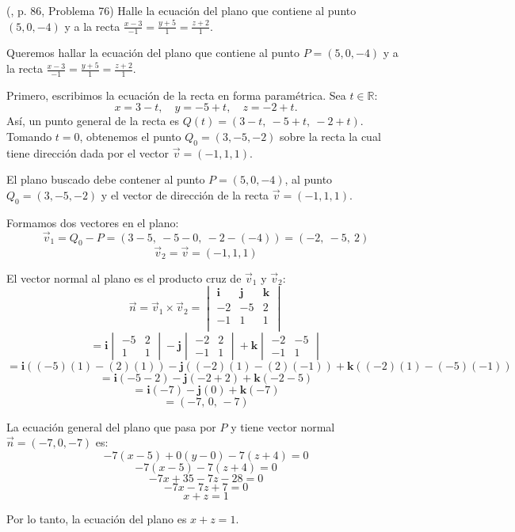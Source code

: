 \begin{prob} (\cite{espinoza2006Algebralineal}, p. 86, Problema 76) Halle la ecuación del plano que contiene al punto $(5,0,-4)$ y a la recta $\frac{x-3}{-1}=\frac{y+5}{1}=\frac{z+2}{1}$. 
\begin{myproof}
Queremos hallar la ecuación del plano que contiene al punto $P = (5,0,-4)$ y a la recta \(\frac{x-3}{-1} = \frac{y+5}{1} = \frac{z+2}{1}.\)

Primero, escribimos la ecuación de la recta en forma paramétrica. Sea $t \in \mathbb{R}$:
\[
x = 3 - t, \quad y = -5 + t, \quad z = -2 + t.
\]
Así, un punto general de la recta es $Q(t) = (3 - t,\ -5 + t,\ -2 + t)$.  
Tomando $t = 0$, obtenemos el punto $Q_0 = (3, -5, -2)$ sobre la recta la cual tiene dirección dada por el vector $\vec{v} = (-1,1,1)$.

El plano buscado debe contener al punto $P = (5,0,-4)$, al punto $Q_0 = (3,-5,-2)$ y el vector de dirección de la recta $\vec{v} = (-1,1,1)$.

Formamos dos vectores en el plano:
\[
\vec{v}_1 = Q_0 - P = (3-5,\ -5-0,\ -2-(-4)) = (-2,\ -5,\ 2)
\]
\[
\vec{v}_2 = \vec{v} = (-1,1,1)
\]

El vector normal al plano es el producto cruz de $\vec{v}_1$ y $\vec{v}_2$:
\[
\vec{n} = \vec{v}_1 \times \vec{v}_2 = 
\begin{vmatrix}
\mathbf{i} & \mathbf{j} & \mathbf{k} \\
-2 & -5 & 2 \\
-1 & 1 & 1 \\
\end{vmatrix}
\]
\[
= \mathbf{i} \begin{vmatrix} -5 & 2 \\ 1 & 1 \end{vmatrix}
- \mathbf{j} \begin{vmatrix} -2 & 2 \\ -1 & 1 \end{vmatrix}
+ \mathbf{k} \begin{vmatrix} -2 & -5 \\ -1 & 1 \end{vmatrix}
\]
\[
= \mathbf{i}((-5)(1) - (2)(1)) - \mathbf{j}((-2)(1) - (2)(-1)) + \mathbf{k}((-2)(1) - (-5)(-1))
\]
\[
= \mathbf{i}(-5 - 2) - \mathbf{j}(-2 + 2) + \mathbf{k}(-2 - 5)
\]
\[
= \mathbf{i}(-7) - \mathbf{j}(0) + \mathbf{k}(-7)
\]
\[
= (-7,\, 0,\, -7)
\]

La ecuación general del plano que pasa por $P$ y tiene vector normal $\vec{n} = (-7,0,-7)$ es:
\[
-7(x - 5) + 0(y - 0) - 7(z + 4) = 0
\]
\[
-7(x - 5) - 7(z + 4) = 0
\]
\[
-7x + 35 - 7z - 28 = 0
\]
\[
-7x - 7z + 7 = 0
\]
\[
x + z = 1
\]

Por lo tanto, la ecuación del plano es \(\boxed{x + z = 1}.\)
\end{myproof}

\end{prob}

